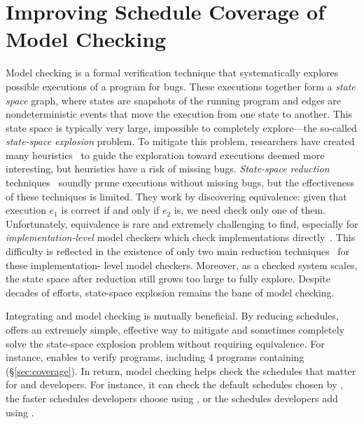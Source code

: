 \chapter{Improving Schedule Coverage of Model Checking} \label{sec:mc}


Model checking is a formal verification technique that systematically
explores possible executions of a program for bugs.  These executions
together form a \emph{state space} graph, where states are snapshots of the
running program and edges are nondeterministic events that move the
execution from one state to another.  This state space is typically very
large, impossible to completely explore---the so-called \emph{state-space explosion} problem.
To mitigate this problem, researchers have created
many heuristics~\cite{yang:fisc:osdi,musuvathi:aodv,killian:macemc:nsdi07} to 
guide the exploration toward executions
deemed more interesting, but heuristics have a risk of missing bugs.
\emph{State-space reduction} techniques~\cite{flanagan:dynamicpo,godefroid:verisoft,demeter:sosp11}
soundly prune executions without missing bugs, but the effectiveness of these techniques
is limited.  They work by discovering equivalence: given
that execution $e_1$ is correct if and only if $e_2$ is, we need check only
one of them. Unfortunately, equivalence is rare and extremely challenging
to find, especially for \emph{implementation-level} model checkers which
check implementations directly~\cite{godefroid:verisoft,musuvathi:aodv,yang:fisc:osdi,
yang:explode:osdi,killian:macemc:nsdi07,dbug:spin11}.
This difficulty is reflected in the existence of only two main reduction
techniques~\cite{flanagan:dynamicpo, demeter:sosp11} for these implementation-
level model checkers.  Moreover, as a checked system scales, the state space after
reduction still grows too large to fully explore.  Despite
decades of efforts, state-space explosion remains the bane of model
checking.

Integrating \smt and model checking is
mutually beneficial.  By reducing schedules, \smt offers an extremely
simple, effective way to mitigate and sometimes completely solve the
state-space explosion problem without requiring equivalence.  For
instance, \parrot enables \dbug to verify \nprogverifiedxxx programs,
including 4 programs containing \nondets (\S\ref{sec:coverage}).
In return, model checking helps check the schedules that matter for \parrot and developers.
For instance, it can check the default schedules chosen by \parrot, the
faster schedules developers choose using \computes, or the schedules
developers add using \nondets.

